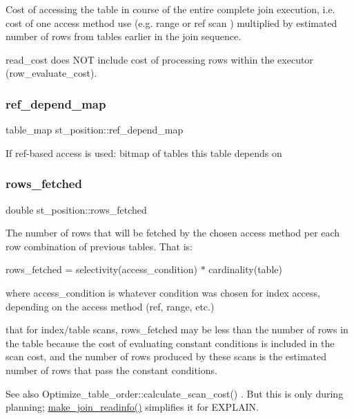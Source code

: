Cost of accessing the table in course of the entire complete join execution, i.\+e. cost of one access method use (e.\+g. \textquotesingle{}range\textquotesingle{} or \textquotesingle{}ref\textquotesingle{} scan ) multiplied by estimated number of rows from tables earlier in the join sequence.

read\+\_\+cost does N\+OT include cost of processing rows within the executor (row\+\_\+evaluate\+\_\+cost). \mbox{\label{structst__position_a0adedeafc969f1754149c722665d64c0}} 
\subsubsection{\texorpdfstring{ref\+\_\+depend\+\_\+map}{ref\_depend\_map}}
{\footnotesize\ttfamily table\+\_\+map st\+\_\+position\+::ref\+\_\+depend\+\_\+map}

If ref-\/based access is used\+: bitmap of tables this table depends on \mbox{\label{structst__position_aa38b3dcf630fb252f9eae43cb1d8a847}} 
\subsubsection{\texorpdfstring{rows\+\_\+fetched}{rows\_fetched}}
{\footnotesize\ttfamily double st\+\_\+position\+::rows\+\_\+fetched}

The number of rows that will be fetched by the chosen access method per each row combination of previous tables. That is\+:

rows\+\_\+fetched = selectivity(access\+\_\+condition) $\ast$ cardinality(table)

where \textquotesingle{}access\+\_\+condition\textquotesingle{} is whatever condition was chosen for index access, depending on the access method (\textquotesingle{}ref\textquotesingle{}, \textquotesingle{}range\textquotesingle{}, etc.)

that for index/table scans, rows\+\_\+fetched may be less than the number of rows in the table because the cost of evaluating constant conditions is included in the scan cost, and the number of rows produced by these scans is the estimated number of rows that pass the constant conditions. \begin{DoxySeeAlso}{See also}
Optimize\+\_\+table\+\_\+order\+::calculate\+\_\+scan\+\_\+cost() . But this is only during planning; \mbox{\hyperlink{group__Query__Optimizer_ga27b74179b9a9207753aa3f93a9df4225}{make\+\_\+join\+\_\+readinfo()}} simplifies it for E\+X\+P\+L\+A\+IN. 
\end{DoxySeeAlso}
\mbox{\label{structst__position_ab27ba77e3972eeb713a371d38657ce1f}} 
